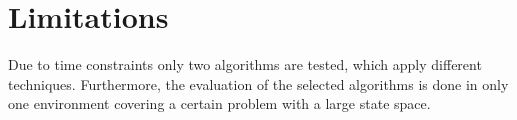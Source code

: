 \section{Limitations}
\label{sec:limitations}

Due to time constraints only two algorithms are tested, which apply different techniques. Furthermore, the evaluation of the selected algorithms is done in only one environment covering a certain problem with a large state space. 

